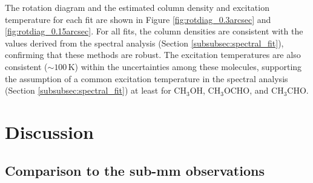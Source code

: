 \documentclass[linenumbers, twocolumn, twocolappendix, astrosymb, times]{aastex631}
\newcommand{\methanol}{CH$_3$OH\xspace}
\newcommand{\acetaldehyde}{CH$_3$CHO\xspace}
\newcommand{\methylformate}{CH$_3$OCHO\xspace}
\begin{document}
\begin{figure*}
\caption{Rotation diagram of \methanol, \methylformate, and \acetaldehyde with an emitting radius of $R_\mathrm{s} = 0\farcs3$ and a line width of $\Delta V_\mathrm{FWHM} = 0.5$ km s$^{-1}$. The black points denotes the observed values with the correction for optical depth. The individual blue lines indicates the models generated from the samples randomly selected from the posterior distributions. The median values of the posterior distributions of $N$ and $T_\mathrm{ex}$ with associated uncertainties (16th and 84th percentiles of the posterior distributions) are shown in the lower-left corner. These uncertainties only account for the statistical uncertainty.}
\label{fig:rotdiag_0.3arcsec}
\end{figure*}

\begin{figure*}
\caption{Same as Figure \ref{fig:rotdiag_0.3arcsec}, but with an emitting radius of $R_\mathrm{s} = 0\farcs15$ and a line width of $\Delta V_\mathrm{FWHM} = 1.2$ km s$^{-1}$.}
\label{fig:rotdiag_0.15arcsec}
\end{figure*}

The rotation diagram and the estimated column density and excitation temperature for each fit are shown in Figure \ref{fig:rotdiag_0.3arcsec} and \ref{fig:rotdiag_0.15arcsec}. For all fits, the column densities are consistent with the values derived from the spectral analysis (Section \ref{subsubsec:spectral_fit}), confirming that these methods are robust. The excitation temperatures are also consistent ($\sim100\,\mathrm{K}$) within the uncertainties among these molecules, supporting the assumption of a common excitation temperature in the spectral analysis (Section \ref{subsubsec:spectral_fit}) at least for \methanol, \methylformate, and \acetaldehyde. 







\section{Discussion} \label{sec:discussion}
\subsection{Comparison to the sub-mm observations}
\end{document}
